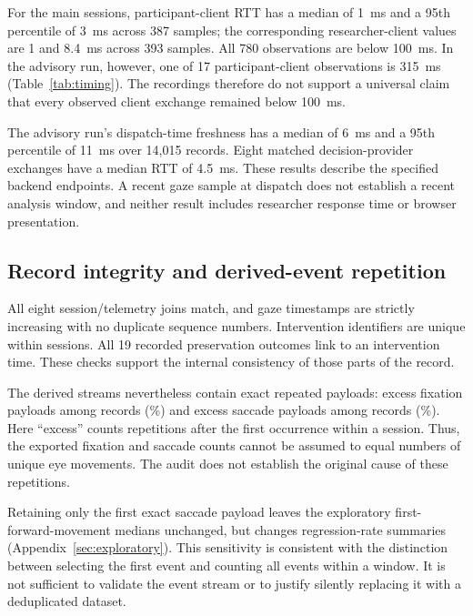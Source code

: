 For the main sessions, participant-client RTT has a median of 1~ms and a 95th percentile of 3~ms across 387 samples; the corresponding researcher-client values are 1 and 8.4~ms across 393 samples. All 780 observations are below 100~ms. In the advisory run, however, one of 17 participant-client observations is 315~ms (Table~\ref{tab:timing}). The recordings therefore do not support a universal claim that every observed client exchange remained below 100~ms.

The advisory run's dispatch-time freshness has a median of 6~ms and a 95th percentile of 11~ms over 14,015 records. Eight matched decision-provider exchanges have a median RTT of 4.5~ms. These results describe the specified backend endpoints. A recent gaze sample at dispatch does not establish a recent analysis window, and neither result includes researcher response time or browser presentation.

\subsection{Record integrity and derived-event repetition}

All eight session/telemetry joins match, and gaze timestamps are strictly increasing with no duplicate sequence numbers. Intervention identifiers are unique within sessions. All 19 recorded preservation outcomes link to an intervention time. These checks support the internal consistency of those parts of the record.

The derived streams nevertheless contain exact repeated payloads: \duplicateFixations{} excess fixation payloads among \fixationTotal{} records (\duplicateFixationPct{}\%) and \duplicateSaccades{} excess saccade payloads among \saccadeTotal{} records (\duplicateSaccadePct{}\%). Here ``excess'' counts repetitions after the first occurrence within a session. Thus, the exported fixation and saccade counts cannot be assumed to equal numbers of unique eye movements. The audit does not establish the original cause of these repetitions.

Retaining only the first exact saccade payload leaves the exploratory first-forward-movement medians unchanged, but changes regression-rate summaries (Appendix~\ref{sec:exploratory}). This sensitivity is consistent with the distinction between selecting the first event and counting all events within a window. It is not sufficient to validate the event stream or to justify silently replacing it with a deduplicated dataset.


